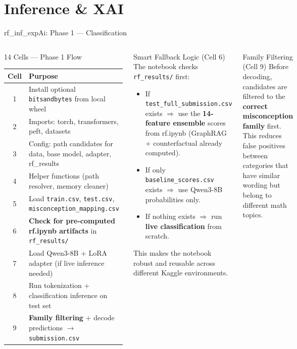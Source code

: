 \documentclass[aspectratio=169]{beamer}
\begin{document}
\section{Inference \& XAI}

\begin{frame}{rf\_inf\_expAi: Phase 1 --- Classification}
\begin{columns}[T]
\begin{block}{14 Cells --- Phase 1 Flow}
\footnotesize
\begin{tabular}{cp{6.5cm}}
\toprule
\textbf{Cell} & \textbf{Purpose}\\
\midrule
1 & Install optional \texttt{bitsandbytes} from local wheel\\
2 & Imports: torch, transformers, peft, datasets\\
3 & Config: path candidates for data, base model, adapter, rf\_results\\
4 & Helper functions (path resolver, memory cleaner)\\
5 & Load \texttt{train.csv}, \texttt{test.csv}, \texttt{misconception\_mapping.csv}\\
6 & \textbf{Check for pre-computed rf.ipynb artifacts} in \texttt{rf\_results/}\\
7 & Load Qwen3-8B + LoRA adapter (if live inference needed)\\
8 & Run tokenization + classification inference on test set\\
9 & \textbf{Family filtering} $+$ decode predictions $\rightarrow$ \texttt{submission.csv}\\
\bottomrule
\end{tabular}
\end{block}
\begin{block}{Smart Fallback Logic (Cell 6)}
The notebook checks \texttt{rf\_results/} first:
\begin{itemize}
  \item If \texttt{test\_full\_submission.csv} exists $\Rightarrow$ use the \textbf{14-feature ensemble} scores from rf.ipynb (GraphRAG + counterfactual already computed).
  \item If only \texttt{baseline\_scores.csv} exists $\Rightarrow$ use Qwen3-8B probabilities only.
  \item If nothing exists $\Rightarrow$ run \textbf{live classification} from scratch.
\end{itemize}
This makes the notebook robust and reusable across different Kaggle environments.
\end{block}
\vspace{6pt}
\begin{block}{Family Filtering (Cell 9)}
Before decoding, candidates are filtered to the \textbf{correct misconception family} first. This reduces false positives between categories that have similar wording but belong to different math topics.
\end{block}
\end{columns}
\end{frame}
\end{document}
